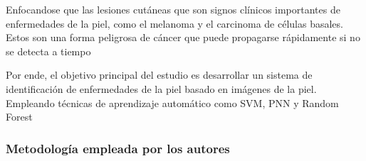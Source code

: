 Enfocandose que las lesiones cutáneas que son signos clínicos importantes de enfermedades de la piel, como el melanoma y el carcinoma de células basales. Estos son una forma peligrosa de cáncer que puede propagarse rápidamente si no se detecta a tiempo

Por ende, el objetivo principal del estudio es desarrollar un sistema de identificación de enfermedades de la piel basado en imágenes de la piel. Empleando técnicas de aprendizaje automático como SVM, PNN y Random Forest

\subsubsection{Metodología empleada por los autores}
\newcommand{\MEDSone}{ Recopilación de la data: En este caso no se especifica el tamaño o la fuente exacta del conjunto de datos. Sin embargo, menciona que se empleó un conjunto de datos de imágenes dermoscópicas para identificar y clasificar diferentes tipos de lesiones de piel, como lentigo simple, melanoma, carcinoma basocelular, entre otros.
	
}
\newcommand{\MEDStwo}{ Preprocesamiento: Se dividio en dos etapas: 

- Primera etapa: Removieron el ruido de las imágenes para eliminar pelos y burbujas que pueden afectar la extracción de características,  utilizando un filtro de mediana.

- Segunda etapa: Uso del algoritmo de segmentación Mean Shift para separar la región de interés (ROI) que contiene la lesión del fondo de la imagen.
	
}

